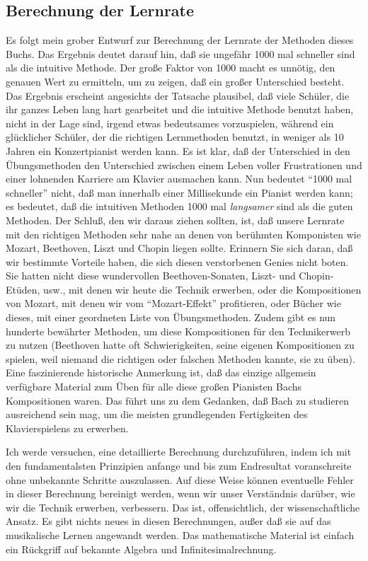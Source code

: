 
\subsection{Berechnung der Lernrate}
\label{c1iv5}

Es folgt mein grober Entwurf zur Berechnung der Lernrate der Methoden dieses Buchs.
Das Ergebnis deutet darauf hin, daß sie ungefähr 1000 mal schneller sind als die intuitive Methode.
Der große Faktor von 1000 macht es unnötig, den genauen Wert zu ermitteln, um zu zeigen, daß ein großer Unterschied besteht.
Das Ergebnis erscheint angesichts der Tatsache plausibel, daß viele Schüler, die ihr ganzes Leben lang hart gearbeitet und die intuitive Methode benutzt haben, nicht in der Lage sind, irgend etwas bedeutsames vorzuspielen, während ein glücklicher Schüler, der die richtigen Lernmethoden benutzt, in weniger als 10 Jahren ein Konzertpianist werden kann.
Es ist klar, daß der Unterschied in den Übungsmethoden den Unterschied zwischen einem Leben voller Frustrationen und einer lohnenden Karriere am Klavier ausmachen kann.
Nun bedeutet \enquote{1000 mal schneller} nicht, daß man innerhalb einer Millisekunde ein Pianist werden kann; es bedeutet, daß die intuitiven Methoden 1000 mal \textit{langsamer} sind als die guten Methoden.
Der Schluß, den wir daraus ziehen sollten, ist, daß unsere Lernrate mit den richtigen Methoden sehr nahe an denen von berühmten Komponisten wie Mozart, Beethoven, Liszt und Chopin liegen sollte.
Erinnern Sie sich daran, daß wir bestimmte Vorteile haben, die sich diesen verstorbenen Genies nicht boten.
Sie hatten nicht diese wundervollen Beethoven-Sonaten, Liszt- und Chopin-Etüden, usw., mit denen wir heute die Technik erwerben, oder die Kompositionen von Mozart, mit denen wir vom \enquote{Mozart-Effekt} profitieren, oder Bücher wie dieses, mit einer geordneten Liste von Übungsmethoden.
Zudem gibt es nun hunderte bewährter Methoden, um diese Kompositionen für den Technikerwerb zu nutzen (Beethoven hatte oft Schwierigkeiten, seine eigenen Kompositionen zu spielen, weil niemand die richtigen oder falschen Methoden kannte, sie zu üben).
Eine faszinierende historische Anmerkung ist, daß das einzige allgemein verfügbare Material zum Üben für alle diese großen Pianisten Bachs Kompositionen waren.
Das führt uns zu dem Gedanken, daß Bach zu studieren ausreichend sein mag, um die meisten grundlegenden Fertigkeiten des Klavierspielens zu erwerben.

Ich werde versuchen, eine detaillierte Berechnung durchzuführen, indem ich mit den fundamentalsten Prinzipien anfange und bis zum Endresultat voranschreite ohne unbekannte Schritte auszulassen.
Auf diese Weise können eventuelle Fehler in dieser Berechnung bereinigt werden, wenn wir unser Verständnis darüber, wie wir die Technik erwerben, verbessern.
Das ist, offensichtlich, der wissenschaftliche Ansatz.
Es gibt nichts neues in diesen Berechnungen, außer daß sie auf das musikalische Lernen angewandt werden.
Das mathematische Material ist einfach ein Rückgriff auf bekannte Algebra und Infinitesimalrechnung.

